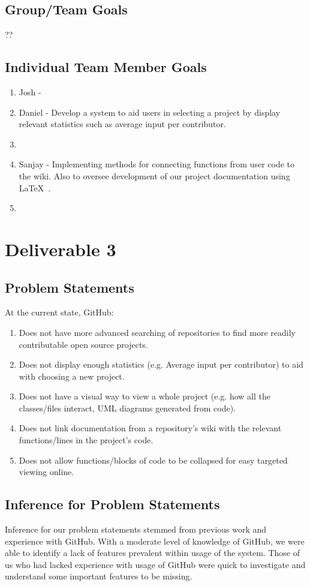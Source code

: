 \documentclass[12pt]{article}
\begin{document}
\subsection{Group/Team Goals}
??
\subsection{Individual Team Member Goals}
\begin{enumerate}
\item Josh - 
\item Daniel - Develop a system to aid users in selecting a project by display relevant statistics such as average input per contributor.  
\item 
\item Sanjay - Implementing methods for connecting functions from user code to the wiki. Also to oversee development of our project documentation using \LaTeX\ .
\item 
\end{enumerate}

\setcounter{section}{3}
\setcounter{subsection}{0}
\section*{Deliverable 3}
\subsection{Problem Statements}
At the current state, GitHub:
\begin{enumerate}
\item  Does not have more advanced searching of repositories to find more readily contributable open source projects.
\item Does not display enough statistics (e.g. Average input per contributor) to aid with choosing a new project.
\item Does not  have a visual way to view a whole project (e.g. how all the classes/files interact, UML diagrams generated from code).
\item Does not link documentation from a repository's wiki with the relevant functions/lines in the project's code.
\item Does not allow functions/blocks of code to be collapsed for easy targeted viewing online.
\end{enumerate}

\subsection{Inference for Problem Statements}
Inference for our problem statements stemmed from previous work and experience with \textsf{GitHub}. With a moderate level of knowledge of \textsf{GitHub}, we were able to identify a lack of features prevalent within usage of the system. Those of us who had lacked experience with usage of \textsf{GitHub} were quick to investigate and understand some important features to be missing.
\end{document}
